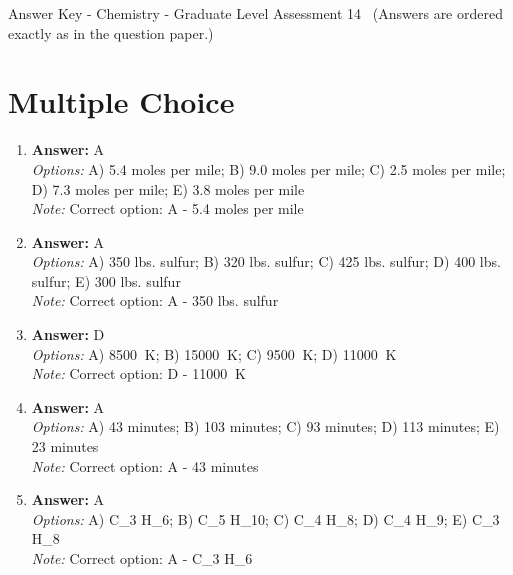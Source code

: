 \documentclass[12pt]{article}
\begin{document}
\begin{center}
Answer Key - Chemistry - Graduate Level Assessment 14 \
\small (Answers are ordered exactly as in the question paper.)
\end{center}

\section*{Multiple Choice}
\begin{enumerate}[label=\arabic*.]
\item \textbf{Answer:} A
\\ \textit{Options:} A) 5.4 moles per mile; B) 9.0 moles per mile; C) 2.5 moles per mile; D) 7.3 moles per mile; E) 3.8 moles per mile
\\ \textit{Note:} Correct option: A - 5.4 moles per mile
\item \textbf{Answer:} A
\\ \textit{Options:} A) 350 lbs. sulfur; B) 320 lbs. sulfur; C) 425 lbs. sulfur; D) 400 lbs. sulfur; E) 300 lbs. sulfur
\\ \textit{Note:} Correct option: A - 350 lbs. sulfur
\item \textbf{Answer:} D
\\ \textit{Options:} A) 8500 $\mathrm{~K}$; B) 15000 $\mathrm{~K}$; C) 9500 $\mathrm{~K}$; D) 11000 $\mathrm{~K}$
\\ \textit{Note:} Correct option: D - 11000 $\mathrm{~K}$
\item \textbf{Answer:} A
\\ \textit{Options:} A) 43 minutes; B) 103 minutes; C) 93 minutes; D) 113 minutes; E) 23 minutes
\\ \textit{Note:} Correct option: A - 43 minutes
\item \textbf{Answer:} A
\\ \textit{Options:} A) C\_3 H\_6; B) C\_5 H\_10; C) C\_4 H\_8; D) C\_4 H\_9; E) C\_3 H\_8
\\ \textit{Note:} Correct option: A - C\_3 H\_6
\end{enumerate}
\end{document}
